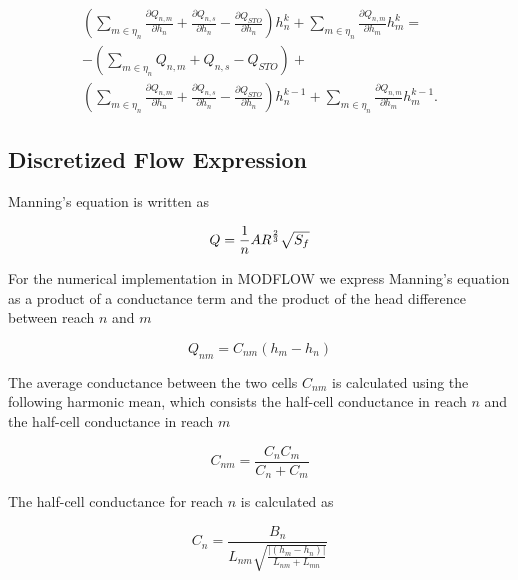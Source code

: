 \documentclass[fleqn]{article}
\begin{document}
\begin{equation}
\label{eqn:nr-cvfd}
\begin{split}
\left ( \sum\limits_{m \in \eta_{n}} \frac{\partial Q_{n,m}}{\partial h_n} + \frac{\partial Q_{n,s}}{\partial h_n} - \frac{\partial Q_{STO}}{\partial h_n} \right ) h^k_n + 
\sum\limits_{m \in \eta_{n}} \frac{\partial Q_{n,m}}{\partial h_m} h^k_{m} = \\
- \left ( \sum\limits_{m \in \eta_{n}} Q_{n,m} + Q_{n,s} - Q_{STO} \right ) + \\
\left ( \sum\limits_{m \in \eta_{n}} \frac{\partial Q_{n,m}}{\partial h_n} + \frac{\partial Q_{n,s}}{\partial h_n} - \frac{\partial Q_{STO}}{\partial h_n} \right ) h^{k-1}_n + \sum\limits_{m \in \eta_{n}} \frac{\partial Q_{n,m}}{\partial h_m} h^{k-1}_{m}.
\end{split}
\end{equation}


\subsection{Discretized Flow Expression}

Manning's equation is written as

\begin{equation}
  Q = \frac{1}{n} A R^{2 \over 3} \sqrt{S_f}
\end{equation}

\noindent For the numerical implementation in MODFLOW we express Manning's equation as a product of a conductance term and the product of the head difference between reach $n$ and $m$

\begin{equation}
  Q_{nm} = C_{nm} \left ( h_m - h_n \right )
\end{equation}

\noindent The average conductance between the two cells $C_{nm}$ is calculated using the following harmonic mean, which consists the half-cell conductance in reach $n$ and the half-cell conductance in reach $m$

\begin{equation}
  C_{nm} = \frac{C_n  C_m}{C_n + C_m}
\end{equation}

The half-cell conductance for reach $n$ is calculated as

\begin{equation}
  C_n = \frac{B_n}{ L_{nm} \sqrt{ \frac{ | \left ( h_m - h_n \right ) | } {L_{nm} + L_{mn}}} }
\end{equation}
\end{document}
